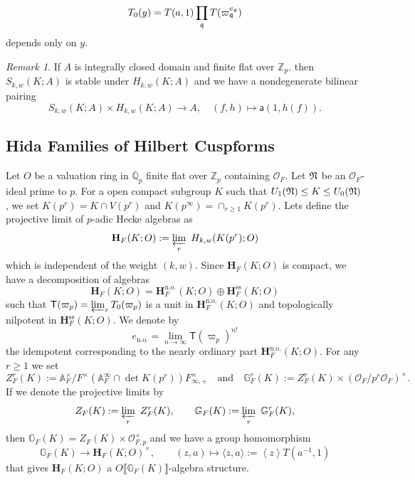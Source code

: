 \documentclass[10pt]{amsart}
\numberwithin{equation}{section}
\theoremstyle{definition}
\theoremstyle{remark} %
\newtheorem{rmk}[thm]{Remark}
\newcommand{\bb}{\mathbb}
\newcommand{\mbf}{\mathbf}
\newcommand{\msf}{\mathsf}
\newcommand{\mrm}{\mathrm}
\newcommand{\diam}[1]{\left\langle#1\right\rangle}
\newcommand{\Oo}{\mathcal{O}}
\newcommand{\Zp}{\mathbb{Z}_p}
\begin{document}
	\begin{equation}
		\label{big_T_operator}
		T_0(y) = T(a,1)\prod_{\frak{q}} T(\varpi_{\frak{q}}^{e_\frak{q}})
	\end{equation}
	depends only on $ y $.
	\begin{rmk}\cite[Theorem 2.2]{Hida91}
		\label{cuspform_pairing}
		If $ A $ is integrally closed domain and finite flat over $ \Zp $. then $ S_{k,w}(K;A) $ is stable under $ H_{k,w}(K;A) $ and we have a nondegenerate bilinear pairing
		\begin{equation*}
			S_{k,w}(K;A) \times H_{k,w}(K;A) \rightarrow A, \quad (f,h) \mapsto \msf{a}(1,h(f)).
		\end{equation*}
	\end{rmk}
	\subsection{Hida Families of Hilbert Cuspforms}
	\label{2.2}
	Let $O$ be a valuation ring  in $\overline{\bb{Q}}_p$ finite flat over $\bb{Z}_p$ containing $ \Oo_F $. Let $\frak{N}$ be an $\mathcal{O}_F$-ideal prime to $p$. For a open compact subgroup $ K $ such that $U_1(\frak{N})\le K\le U_0(\frak{N})$, we set
	$K(p^r) = K \cap V(p^r)$ and $K(p^\infty) = \cap_{r\ge1} K(p^r)$. Lets define the projective limit of $p$-adic Hecke algebras as
	\[
	\mbf{H}_F(K;O):=\varprojlim_r\ H_{k,w}(K(p^r);O)
	\]
	which is independent of the weight $(k,w)$. Since $\mathbf{H}_F(K;O)$ is compact, we have a decomposition of algebras
	\[
	\mathbf{H}_F(K;O) = \mathbf{H}^{\mrm{n.o.}}_F(K;O) \oplus \mathbf{H}_F^{\mrm{ss}}(K;O)
	\] 
	such that $\msf{T}(\varpi_p) = \varprojlim_r T_0(\varpi_p) $ is a unit in $\mathbf{H}_F^{\mrm{n.o.}}(K;O)$ and topologically nilpotent in $\mathbf{H}_F^{\mrm{ss}}(K;O)$. We denote by 
	\begin{equation}\label{eno}
		e_{\mrm{n.o.}} = \underset{n \to \infty}{\lim} \msf{T}(\varpi_p)^{n!}
	\end{equation}
	the idempotent corresponding to the nearly ordinary part $\mathbf{H}^{\mrm{n.o.}}_F(K;O)$. 
	For any $r\ge1$ we set
	\begin{equation}
		Z^r_F(K) := \bb{A}_F^\times/F^\times (\bb{A}_{F}^\infty \cap \det K(p^r)) F_{\infty,+}^\times\quad\text{and}\quad \bb{G}_F^r(K):= Z^r_F(K)\times(\mathcal{O}_F/p^r\mathcal{O}_F)^\times.
	\end{equation}
	If we denote the projective limits by
	\begin{equation}
		Z_F(K):= \varprojlim_r\ Z^r_F(K),\qquad \bb{G}_F(K) :=\varprojlim_r\ \bb{G}^r_F(K),
	\end{equation}
	then $\bb{G}_F(K) = Z_F(K)\times\mathcal{O}_{F,p}^\times$ and we have a group homomorphism 
	\begin{equation}
		\bb{G}_F(K)\to \mathbf{H}_F(K;O)^\times,\qquad (z,a)\mapsto \langle z,a\rangle:=\diam{z} T(a^{-1},1)
	\end{equation}
	that gives  $\mbf{H}_F(K;O)$ a $O\llbracket\bb{G}_F(K)\rrbracket$-algebra structure.
	
\end{document}
